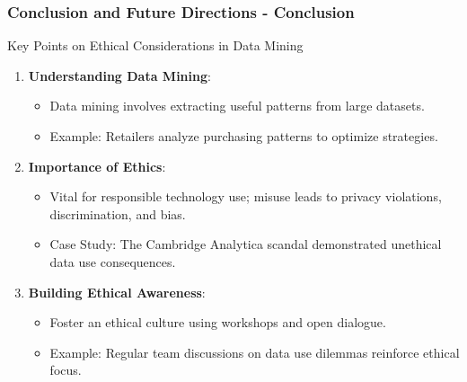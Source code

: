 \documentclass[aspectratio=169]{beamer}
\begin{document}
\begin{frame}[fragile]
    \frametitle{Conclusion and Future Directions - Conclusion}
    
    \begin{block}{Key Points on Ethical Considerations in Data Mining}
    \begin{enumerate}
        \item \textbf{Understanding Data Mining}: 
        \begin{itemize}
            \item Data mining involves extracting useful patterns from large datasets.
            \item Example: Retailers analyze purchasing patterns to optimize strategies.
        \end{itemize}
        
        \item \textbf{Importance of Ethics}: 
        \begin{itemize}
            \item Vital for responsible technology use; misuse leads to privacy violations, discrimination, and bias.
            \item Case Study: The Cambridge Analytica scandal demonstrated unethical data use consequences.
        \end{itemize}
        
        \item \textbf{Building Ethical Awareness}: 
        \begin{itemize}
            \item Foster an ethical culture using workshops and open dialogue.
            \item Example: Regular team discussions on data use dilemmas reinforce ethical focus.
        \end{itemize}
    \end{enumerate}
    \end{block}
\end{frame}
\end{document}
